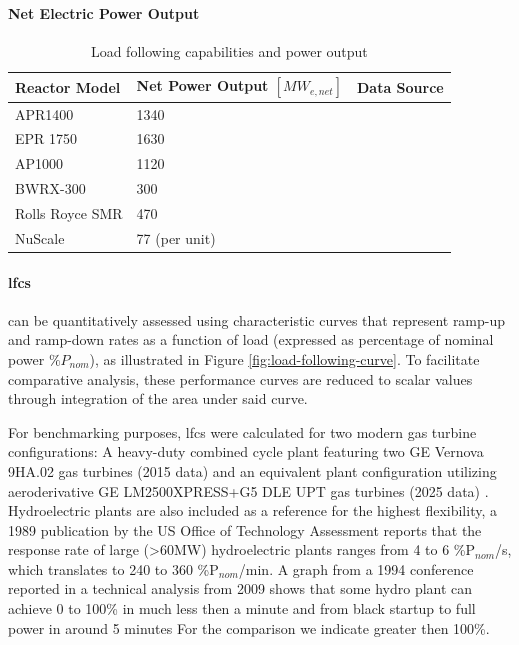 \paragraph{Net Electric Power Output} 
\begin{table}[!ht]
    \centering
    \begin{tabularx}{\textwidth}{l X X}
        \toprule
        \textbf{Reactor Model} & \textbf{Net Power Output $[MW_{e,net}]$} & Data Source\\
        \midrule
        APR1400         & 1340 & \cite{IAEA_PRIS_2025} \\
        EPR 1750        & 1630 & \cite{IAEA_PRIS_2025} \\
        AP1000          & 1120 & \cite{IAEA_PRIS_2025} \\
        BWRX-300        & 300 & \cite{iaea2025aris} \\
        Rolls Royce SMR & 470 & \cite{iaea2025aris} \\
        NuScale         & 77 (per unit) & \cite{iaea2025aris} \\
        \bottomrule
    \end{tabularx}
    \caption{Load following capabilities and power output}
    \label{tab:load-power_output}
\end{table}

\paragraph{\glspl{lfc}} can be quantitatively assessed using characteristic curves that represent ramp-up and ramp-down rates as a function of load (expressed as percentage of nominal power $\%P_{nom}$), as illustrated in Figure \ref{fig:load-following-curve}. To facilitate comparative analysis, these performance curves are reduced to scalar values through integration of the area under said curve.

For benchmarking purposes, \glspl{lfc} were calculated for two modern gas turbine configurations: A heavy-duty combined cycle plant featuring two GE Vernova 9HA.02 gas turbines (2015 data) \cite{GE_9HA_Gas_Turbine_2015} and an equivalent plant configuration utilizing aeroderivative GE LM2500XPRESS+G5 DLE UPT gas turbines (2025 data) \cite{GEVernova_LM2500XPRESS_2025}. Hydroelectric plants are also included as a reference for the highest flexibility, a 1989 publication by the US Office of Technology Assessment \cite{OTA_Electric_Power_Wheeling_1989} reports that the response rate of large (>60MW) hydroelectric plants ranges from 4 to 6 \%P$_{nom}$/s, which translates to 240 to 360 \%P$_{nom}$/min. A graph from a 1994 conference reported in a technical analysis from 2009 shows that some hydro plant can achieve 0 to 100\% in much less then a minute and from black startup to full power in around 5 minutes For the comparison we indicate greater then 100\%. \cite{osti_219975, MWH_Pumped_Storage_Wind_2009}

